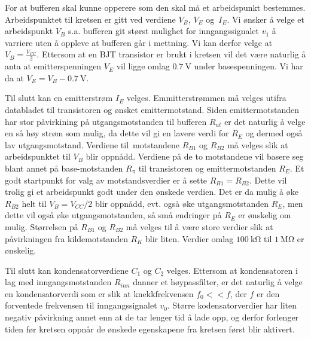 For at bufferen skal kunne opperere som den skal må et arbeidspunkt bestemmes.
Arbeidspunktet til kretsen er gitt ved verdiene $V_B$, $V_E$ og $I_E$. Vi ønsker å velge et arbeidspunkt 
$V_B$ s.a. bufferen git størst mulighet for inngangssignalet $v_1$ å varriere uten å oppleve at bufferen 
går i mettning. Vi kan derfor velge at $V_B = \frac{V_{CC}}{2}$. Ettersom at en BJT transistor er brukt i kretsen 
vil det være naturlig å anta at emitterspenningen $V_E$ vil ligge omlag $\SI{0.7}{\volt}$ under basespenningen.
Vi har da at $V_E = V_B - \SI{0.7}{\volt}$. 

Til slutt kan en emitterstrøm $I_E$ velges. Emmitterstrømmen må velges utifra databladet til transistoren 
og ønsket emittermotstand. Siden emittermotstanden har stor påvirkining på utgangsmotstanden til 
bufferen $R_{ut}$ er det naturlig å velge en så høy strøm som mulig, da dette vil gi en lavere 
verdi for $R_E$ og dermed også lav utgangsmotstand. Verdiene til motstandene $R_{B1}$ og $R_{B2}$ må velges 
slik at arbeidspunktet til $V_B$ blir oppnådd. Verdiene på de to motstandene vil basere seg blant annet 
på base-motstanden $R_{\pi}$ til transistoren og emittermotstanden $R_E$. Et godt startpunkt for valg 
av motstandsverdier er å sette $R_{B1} = R_{B2}$. Dette vil trolig gi et arbeidspunkt godt under den ønskede 
verdien. Det er da mulig å øke $R_{B2}$ helt til $V_B = V_{CC}/2$ blir oppnådd, evt. også øke 
utgangsmotstanden $R_E$, men dette vil også øke utgangsmotstanden, så små endringer på $R_E$ er ønskelig om
mulig. Størrelsen på $R_{B1}$ og $R_{B2}$ må velges til å være store verdier slik at påvirkningen fra 
kildemotstanden $R_K$ blir liten. Verdier omlag $\SI{100}{\kilo\ohm}$ til $\SI{1}{\mega\ohm}$ er ønskelig.

\newpage
Til slutt kan kondensatorverdiene $C_1$ og $C_2$ velges. Ettersom at kondensatoren i lag med 
inngangsmotstanden $R_{inn}$ danner et høypassfilter, er det naturlig å velge en kondensatorverdi som 
er slik at knekkfrekvensen $f_0 << f$, der $f$ er den forventede frekvensen til inngangssignalet $v_0$.
Større kodensatorverdier har liten negativ påvirkning annet enn at de tar lenger tid å lade opp, og derfor 
forlenger tiden før kretsen oppnår de ønskede egenskapene fra kretsen først blir aktivert.
